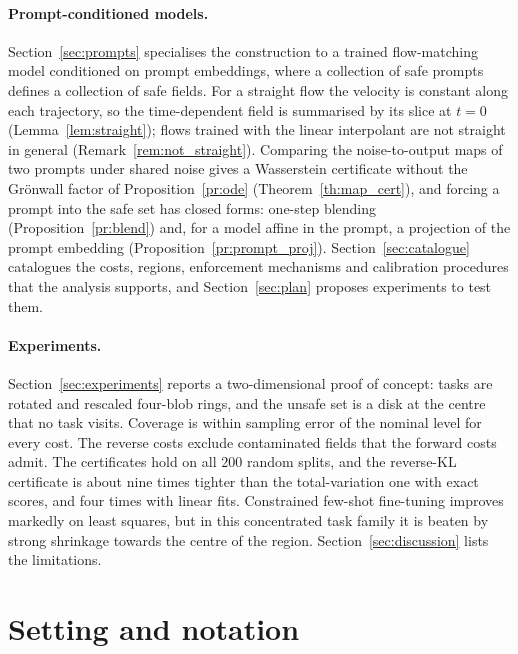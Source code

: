 \documentclass{article}
\theoremstyle{plain}
\begin{document}
\paragraph{Prompt-conditioned models.}
Section~\ref{sec:prompts} specialises the construction to a trained flow-matching model conditioned on
prompt embeddings, where a collection of safe prompts defines a collection of safe fields. For a
straight flow the velocity is constant along each trajectory, so the time-dependent field is
summarised by its slice at $t=0$ (Lemma~\ref{lem:straight}); flows trained with the linear
interpolant are not straight in general (Remark~\ref{rem:not_straight}). Comparing the noise-to-output
maps of two prompts under shared noise gives a Wasserstein certificate without the Gr\"onwall factor
of Proposition~\ref{pr:ode} (Theorem~\ref{th:map_cert}), and forcing a prompt into the safe set has
closed forms: one-step blending (Proposition~\ref{pr:blend}) and, for a model affine in the prompt, a
projection of the prompt embedding (Proposition~\ref{pr:prompt_proj}). Section~\ref{sec:catalogue}
catalogues the costs, regions, enforcement mechanisms and calibration procedures that the analysis
supports, and Section~\ref{sec:plan} proposes experiments to test them.

\paragraph{Experiments.}
Section~\ref{sec:experiments} reports a two-dimensional proof of concept: tasks are rotated
and rescaled four-blob rings, and the unsafe set is a disk at the centre that no task
visits. Coverage is within sampling error of the nominal level for every cost. The reverse
costs exclude contaminated fields that the forward costs admit. The certificates hold on all
$200$ random splits, and the reverse-KL certificate is about nine times tighter than the
total-variation one with exact scores, and four times with linear fits. Constrained few-shot fine-tuning improves markedly on least squares,
but in this concentrated task family it is beaten by strong shrinkage towards the centre of
the region. Section~\ref{sec:discussion} lists the limitations.

\section{Setting and notation}\label{sec:setting}
\end{document}
